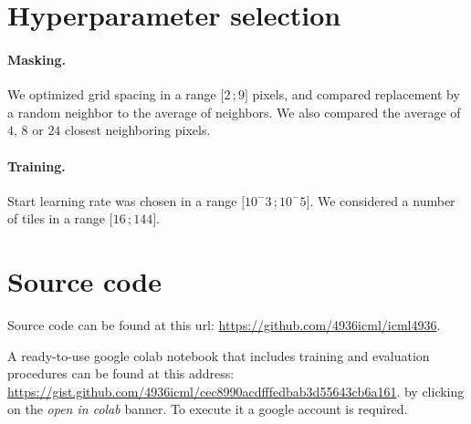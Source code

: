 \documentclass{article}
\newcommand{\interval}[2]{\mathopen{[}#1\,;#2\mathclose{]}}
\begin{document}
\section{Hyperparameter selection}

\paragraph{Masking.}
We optimized grid spacing in a range $\interval{2}{9}$ pixels, and compared replacement by a random neighbor to the average of neighbors. We also compared the average of $4$, $8$ or $24$ closest neighboring pixels.

\paragraph{Training.} Start learning rate was chosen in a range $\interval{10^-3}{10^-5}$. We considered a number of tiles in a range $\interval{16}{144}$.

\section{Source code}
Source code can be found at this url: \url{https://github.com/4936icml/icml4936}.

A ready-to-use google colab notebook that includes training and evaluation procedures can be found at this address: \url{https://gist.github.com/4936icml/cec8990acdfffedbab3d55643cb6a161}.
by clicking on the \textit{open in colab} banner. To execute it a google account is required.

{\small


}
\end{document}
